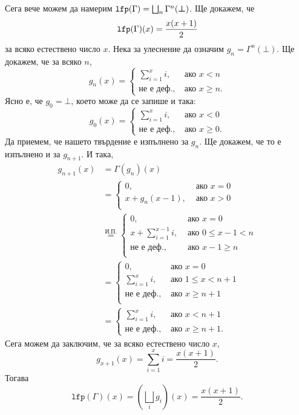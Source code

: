 \begin{example}
  Сега вече можем да намерим $\texttt{lfp}(\Gamma) = \bigsqcup_n \Gamma^n(\bm{\bot})$.
  Ще докажем, че
  \[\texttt{lfp}(\Gamma)(x) = \frac{x(x+1)}{2}\] за всяко естествено число $x$.
  Нека за улеснение да означим $g_n = \Gamma^n(\bm{\bot})$.
  Ще докажем, че за всяко $n$,
  \[g_n(x) = \begin{cases}
      \sum^x_{i=1}i, & \text{ ако } x < n\\
      \text{не е деф.}, & \text{ ако } x \geq n.
    \end{cases}\]
  Ясно е, че $g_0 = \bm{\bot}$, което може да се запише и така:
  \[g_0(x) = \begin{cases}
      \sum^x_{i=1}i, & \text{ ако } x < 0\\
      \text{не е деф.}, & \text{ ако } x \geq 0.
    \end{cases}\]
  Да приемем, че нашето твърдение е изпълнено за $g_n$.
  Ще докажем, че то е изпълнено и за $g_{n+1}$. И така,
  \begin{align*}
    g_{n+1}(x) & = \Gamma(g_n)(x)\\
               &  = \begin{cases}
                 0, & \text{ ако } x = 0\\
                 x + g_n(x-1), & \text{ ако }x > 0\\
               \end{cases}\\
               & \stackrel{\text{И.П.}}{=} \begin{cases}
                 0, & \text{ ако } x = 0\\
                 x + \sum^{x-1}_{i=1}i , & \text{ ако } 0 \leq x-1 < n\\
                 \text{не е деф.}, & \text{ ако }x-1 \geq n\\
               \end{cases}\\
               & = \begin{cases}
                 0, & \text{ ако } x = 0\\
                 \sum^{x}_{i=1}i , & \text{ ако } 1 \leq x < n+1\\
                 \text{не е деф.}, & \text{ ако }x \geq n+1\\
               \end{cases}\\
               & = \begin{cases}
                 \sum^{x}_{i=1}i , & \text{ ако } x < n+1\\
                 \text{не е деф.}, & \text{ ако }x \geq n+1.
               \end{cases}
  \end{align*}
  Сега можем да заключим, че за всяко естествено число $x$,
  \[g_{x+1}(x) = \sum^x_{i=1}i = \frac{x(x+1)}{2}.\]
  Тогава
  \[\texttt{lfp}(\Gamma)(x) = (\bigsqcup_i g_i)(x) = \frac{x(x+1)}{2}.\]
\end{example}



